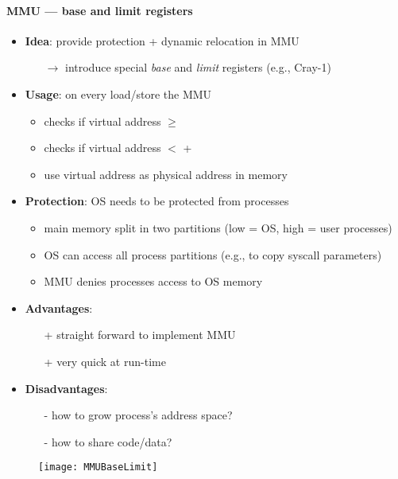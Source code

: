 \paragraph{MMU --- base and limit registers}
\begin{itemize}
  \item \textbf{Idea}: provide protection + dynamic relocation in MMU
  \begin{itemize}
    \item[$ \to $] introduce special \emph{base} and \emph{limit} registers (e.g., Cray-1)
  \end{itemize}
  \item \textbf{Usage}: on every load/store the MMU 
  \begin{itemize}
    \item checks if virtual address \( \geq \) 
    \item checks if virtual address \( < \)  + 
    \item use virtual address as physical address in memory
  \end{itemize}
  \item \textbf{Protection}: OS needs to be protected from processes
  \begin{itemize}
    \item main memory split in two partitions (low = OS, high = user processes)
    \item OS can access all process partitions (e.g., to copy syscall parameters)
    \item MMU denies processes access to OS memory
  \end{itemize}
  \item \textbf{Advantages}:
  \begin{itemize}
    \item[+] straight forward to implement MMU
    \item[+] very quick at run-time
  \end{itemize}
  \item \textbf{Disadvantages}:
  \begin{itemize}
    \item[-] how to grow process's address space?
    \item[-] how to share code/data?
  \end{itemize}
\end{itemize}
\begin{figure}[h]\centering\label{MMUBaseLimit}\texttt{[image: MMUBaseLimit]}\end{figure}


